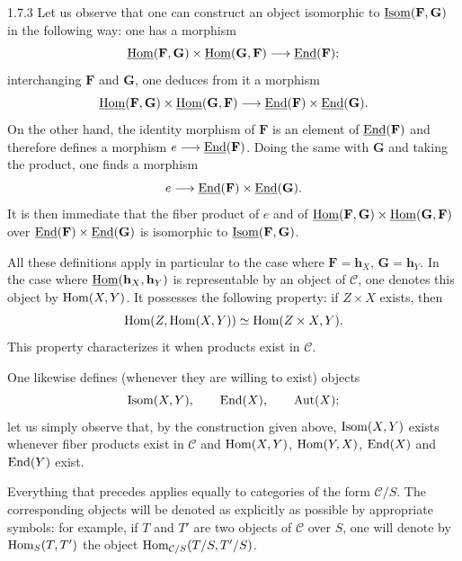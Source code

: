 \begin{remark}{1.7.3}
\label{I.1.7.3}
Let us observe that one can construct an object isomorphic to \(\underline{\operatorname{Isom}}(\mathbf{F},\mathbf{G})\) in the following way: one has a morphism
\[
\underline{\operatorname{Hom}}(\mathbf{F},\mathbf{G})\times\underline{\operatorname{Hom}}(\mathbf{G},\mathbf{F})\longrightarrow\underline{\operatorname{End}}(\mathbf{F});
\]
interchanging \(\mathbf{F}\) and \(\mathbf{G}\), one deduces from it a morphism
\[
\underline{\operatorname{Hom}}(\mathbf{F},\mathbf{G})\times\underline{\operatorname{Hom}}(\mathbf{G},\mathbf{F})
\longrightarrow\underline{\operatorname{End}}(\mathbf{F})\times\underline{\operatorname{End}}(\mathbf{G}).
\]
On the other hand, the identity morphism of \(\mathbf{F}\) is an element of \(\underline{\operatorname{End}}(\mathbf{F})\) and therefore defines a morphism \(e\longrightarrow\underline{\operatorname{End}}(\mathbf{F})\). Doing the same with \(\mathbf{G}\) and taking the product, one finds a morphism
\[
e\longrightarrow\underline{\operatorname{End}}(\mathbf{F})\times\underline{\operatorname{End}}(\mathbf{G}).
\]
It is then immediate that the fiber product of \(e\) and of \(\underline{\operatorname{Hom}}(\mathbf{F},\mathbf{G})\times\underline{\operatorname{Hom}}(\mathbf{G},\mathbf{F})\) over \(\underline{\operatorname{End}}(\mathbf{F})\times\underline{\operatorname{End}}(\mathbf{G})\) is isomorphic to \(\underline{\operatorname{Isom}}(\mathbf{F},\mathbf{G})\).
\end{remark}

All these definitions apply in particular to the case where \(\mathbf{F}=\mathbf{h}_X\), \(\mathbf{G}=\mathbf{h}_Y\). In the case where \(\underline{\operatorname{Hom}}(\mathbf{h}_X,\mathbf{h}_Y)\) is representable by an object of \(\mathcal{C}\), one denotes this object by \(\operatorname{Hom}(X,Y)\). It possesses the following property: if \(Z\times X\) exists, then
\[
\operatorname{Hom}(Z,\operatorname{Hom}(X,Y))\simeq\operatorname{Hom}(Z\times X,Y).
\]
This property characterizes it when products exist in \(\mathcal{C}\).

One likewise defines (whenever they are willing to exist) objects
\[
\operatorname{Isom}(X,Y),\qquad\operatorname{End}(X),\qquad\operatorname{Aut}(X);
\]
let us simply observe that, by the construction given above, \(\operatorname{Isom}(X,Y)\) exists whenever fiber products exist in \(\mathcal{C}\) and \(\operatorname{Hom}(X,Y)\), \(\operatorname{Hom}(Y,X)\), \(\operatorname{End}(X)\) and \(\operatorname{End}(Y)\) exist.

Everything that precedes applies equally to categories of the form \(\mathcal{C}/S\). The corresponding objects will be denoted as explicitly as possible by appropriate symbols: for example, if \(T\) and \(T'\) are two objects of \(\mathcal{C}\) over \(S\), one will denote by \(\operatorname{Hom}_S(T,T')\) the object \(\operatorname{Hom}_{\mathcal{C}/S}(T/S,T'/S)\).

